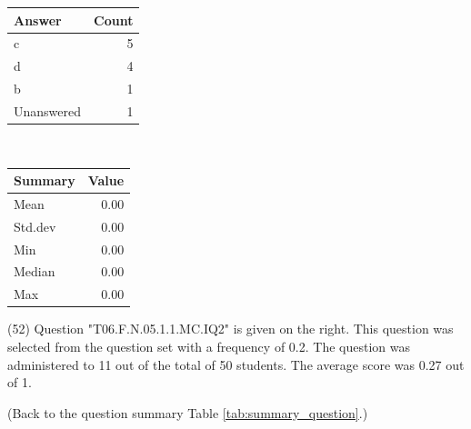 \documentclass[12pt,english,nohyper]{tufte-handout}\usepackage[]{graphicx}\usepackage[]{color}
\begin{document}
\begin{center}%
\begin{tabular}{lr}
  \hline
Answer & Count \\ 
  \hline
c &   5 \\ 
  d &   4 \\ 
  b &   1 \\ 
  Unanswered &   1 \\ 
   \hline
\end{tabular}
~~~~~~~~%
\begin{tabular}{lr}
  \hline
Summary & Value \\ 
  \hline
Mean & 0.00 \\ 
  Std.dev & 0.00 \\ 
  Min & 0.00 \\ 
  Median & 0.00 \\ 
  Max & 0.00 \\ 
   \hline
\end{tabular}
\end{center}\newpage{} (52) Question "T06.F.N.05.1.1.MC.IQ2" is given on the right. This question was selected from the question set with a frequency of 0.2. The question was administered to 11 out of the total of 50 students. The average score was 0.27 out of 1.

 (Back to the question summary Table \ref{tab:summary_question}.)
\end{document}
